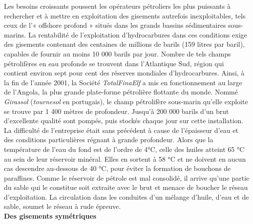 \documentclass[8pt]{article}
\begin{document}
Les besoins croissants poussent les opérateurs pétroliers les plus puissants à rechercher et à mettre en exploitation des gisements autrefois inexploitables, tels ceux de l'« offshore profond » situés dans les grands bassins sédimentaires sous-marins. La rentabilité de l'exploitation d'hydrocarbures dans ces conditions exige des gisements contenant des centaines de millions de barils (159 litres par baril), capables de fournir au moins 10 000 barils par jour. Nombre de tels champs pétrolifères en eau profonde se trouvent dans l'Atlantique Sud, région qui contient environ sept pour cent des réserves mondiales d'hydrocarbures. Ainsi, à la fin de l'année 2001, la Société \textit{TotalFinaElf} a mis en fonctionnement au large de l'Angola, la plus grande plate-forme pétrolière flottante du monde. Nommé \textit{Girassol} (\textit{tournesol} en portugais), le champ pétrolifère sous-marin qu'elle exploite se trouve par 1 400 mètres de profondeur. Jusqu'à 200 000 barils d'un brut d'excellente qualité sont pompés, puis stockés chaque jour sur cette installation. La difficulté de l'entreprise était sans précédent à cause de l'épaisseur d'eau et des conditions particulières régnant à grande profondeur. Alors que la température de l'eau du fond est de l'ordre de 4°C, celle des huiles atteint 65 °C au sein de leur réservoir minéral. Elles en sortent à 58 °C et ne doivent en aucun cas descendre au-dessous de 40 °C, pour éviter la formation de bouchons de paraffines. Comme le réservoir de pétrole est mal consolidé, il arrive qu'une partie du sable qui le constitue soit extraite avec le brut et menace de boucher le réseau d'exploitation. La circulation dans les conduites d'un mélange d'huile, d'eau et de sable, soumet le réseau à rude épreuve.\\

\textbf{Des gisements symétriques}\\
\end{document}
